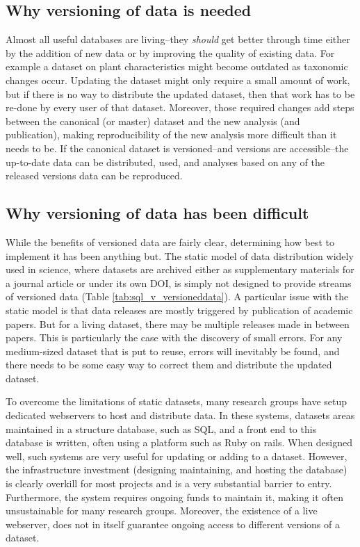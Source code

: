 \documentclass[a4paper,11pt]{article}
\begin{document}
\subsection{Why versioning of data is needed}

Almost all useful databases are living--they \emph{should} get better
through time either by the addition of new data or by improving the
quality of existing data. For example a dataset on plant characteristics
might become outdated as taxonomic changes occur. Updating the dataset might only
require a small amount of work, but if there is no
way to distribute the updated dataset, then that work has to be re-done by
every user of that dataset. Moreover, those required changes add steps
between the canonical (or master) dataset and the new analysis (and publication),
making reproducibility of the new analysis more difficult than it needs
to be. If the canonical dataset is versioned--and versions are
accessible--the up-to-date data can be distributed, used, and analyses
based on any of the released versions data can be reproduced.

\subsection{Why versioning of data has been difficult}

While the benefits of versioned data are fairly clear, determining how best to implement it has been anything but. The static model of data distribution widely used in science, where datasets are archived either as supplementary materials for a journal article
or under its own DOI, is simply not designed to provide streams of versioned
data (Table \ref{tab:sql_v_versioneddata}). A particular issue with the static
model is that data releases are mostly triggered by publication of academic
papers. But for a living dataset, there may be multiple releases made in
between papers. This is particularly the case with the discovery of small
errors. For any medium-sized dataset that is put to reuse, errors will
inevitably be found, and there needs to be some easy  way to correct them and
distribute the updated dataset.

To overcome the limitations of static datasets, many research groups have
setup dedicated webservers to host and distribute data. In these systems,
datasets areas maintained in a structure database, such as SQL, and a front
end to this database is written, often using a platform such as Ruby on rails.
When designed well, such systems are very useful for updating or adding to a
dataset. However, the infrastructure investment (designing maintaining, and
hosting the database) is clearly overkill for most projects and is a very
substantial barrier to entry. Furthermore, the system requires ongoing funds to maintain it, making it often unsustainable for many research groups. Moreover, the existence of a live webserver,
does not in itself guarantee ongoing access to different versions of a
dataset.
\end{document}
